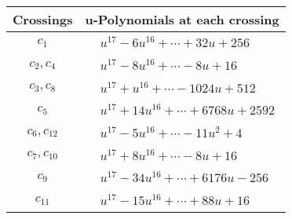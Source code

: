 \documentclass[1p]{elsarticle_modified}
\theoremstyle{definition}
\begin{document}
\begin{tabular}{m{50pt}|m{274pt}}
Crossings & \hspace{64pt}u-Polynomials at each crossing \\
\hline $$\begin{aligned}c_{1}\end{aligned}$$&$\begin{aligned}
&u^{17}-6 u^{16}+\cdots+32 u+256
\end{aligned}$\\
\hline $$\begin{aligned}c_{2},c_{4}\end{aligned}$$&$\begin{aligned}
&u^{17}-8 u^{16}+\cdots-8 u+16
\end{aligned}$\\
\hline $$\begin{aligned}c_{3},c_{8}\end{aligned}$$&$\begin{aligned}
&u^{17}+u^{16}+\cdots-1024 u+512
\end{aligned}$\\
\hline $$\begin{aligned}c_{5}\end{aligned}$$&$\begin{aligned}
&u^{17}+14 u^{16}+\cdots+6768 u+2592
\end{aligned}$\\
\hline $$\begin{aligned}c_{6},c_{12}\end{aligned}$$&$\begin{aligned}
&u^{17}-5 u^{16}+\cdots-11 u^2+4
\end{aligned}$\\
\hline $$\begin{aligned}c_{7},c_{10}\end{aligned}$$&$\begin{aligned}
&u^{17}+8 u^{16}+\cdots-8 u+16
\end{aligned}$\\
\hline $$\begin{aligned}c_{9}\end{aligned}$$&$\begin{aligned}
&u^{17}-34 u^{16}+\cdots+6176 u-256
\end{aligned}$\\
\hline $$\begin{aligned}c_{11}\end{aligned}$$&$\begin{aligned}
&u^{17}-15 u^{16}+\cdots+88 u+16
\end{aligned}$\\
\hline
\end{tabular}\\~\\
\end{document}
